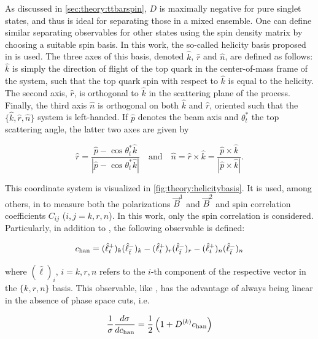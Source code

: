 As discussed in \cref{sec:theory:ttbarspin}, $D$ is maximally negative for pure singlet states, and thus is ideal for separating those in a mixed ensemble. One can define similar separating observables for other states using the spin density matrix by choosing a suitable spin basis. In this work, the so-called helicity basis proposed in  is used. The three axes of this basis, denoted $\hat{k}$, $\hat{r}$ and $\hat{n}$, are defined as follows: $\hat{k}$ is simply the direction of flight of the top quark in the center-of-mass frame of the \ttbar system, such that the top quark spin with respect to $\hat{k}$ is equal to the helicity. The second axis, $\hat{r}$, is orthogonal to $\hat{k}$ in the scattering plane of the \pptt process. Finally, the third axis $\hat{n}$ is orthogonal on both $\hat{k}$ and $\hat{r}$, oriented such that the $\{\hat{k},\hat{r},\hat{n}\}$ system is left-handed. If $\hat{p}$ denotes the beam axis and $\theta^*_t$ the top scattering angle, the latter two axes are given by

\begin{equation}
    \hat{r} = \frac{\hat{p} - \cos \theta^*_t \hat{k}} {| \hat{p} - \cos \theta^*_t \hat{k} |} \quad \mathrm{and} \quad \hat{n} = \hat{r} \times \hat{k} = \frac{\hat{p} \times \hat{k}} {| \hat{p} \times \hat{k} |}.
\end{equation}

This coordinate system is visualized in \cref{fig:theory:helicitybasis}. It is used, among others, in  to measure both the polarizations $\vec{B}^1$ and $\vec{B}^2$ and spin correlation coefficients $C_{ij}$ ($i,j = k,r,n$). In this work, only the spin correlation is considered. Particularly, in addition to \chel, the following observable is defined:

\begin{equation}
    \label{eq:theory:chan}
    c_{\mathrm{han}} = (\hat{\ell}_t^+)_k (\hat{\ell}_{\bar{t}}^-)_k - (\hat{\ell}_t^+)_r (\hat{\ell}_{\bar{t}}^-)_r - (\hat{\ell}_t^+)_n (\hat{\ell}_{\bar{t}}^-)_n
\end{equation}

\noindent where $(\hat{\ell})_i$, $i=k,r,n$ refers to the $i$-th component of the respective vector in the $\{k,r,n\}$ basis. This observable, like \chel, has the advantage of always being linear in the absence of phase space cuts, i.e.

\begin{equation}
    \frac{1}{\sigma} \frac{d \sigma}{d c_{\mathrm{han}}} = \frac{1}{2}\left( 1 + D^{(k)} c_{\mathrm{han}} \right)
\end{equation}

